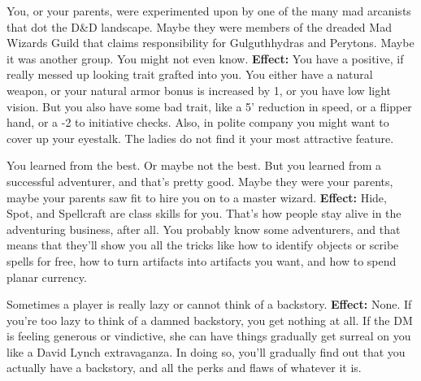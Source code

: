 \medskip{}
{You, or your parents, were experimented upon by one of the many mad arcanists that dot the D\&D landscape. Maybe they were members of the dreaded Mad Wizards Guild that claims responsibility for Gulguthhydras and Perytons. Maybe it was another group. You might not even know.}
\textbf{Effect:}{ You have a positive, if really messed up looking trait grafted into you. You either have a natural weapon, or your natural armor bonus is increased by 1, or you have low light vision. But you also have some bad trait, like a 5' reduction in speed, or a flipper hand, or a -2 to initiative checks. Also, in polite company you might want to cover up your eyestalk. The ladies do not find it your most attractive feature.}

\clearpage
\medskip{}
{You learned from the best. Or maybe not the best. But you learned from a successful adventurer, and that's pretty good. Maybe they were your parents, maybe your parents saw fit to hire you on to a master wizard.}
\textbf{Effect:}{ Hide, Spot, and Spellcraft are class skills for you. That's how people stay alive in the adventuring business, after all. You probably know some adventurers, and that means that they'll show you all the tricks like how to identify objects or scribe spells for free, how to turn artifacts into artifacts you want, and how to spend planar currency.}

\medskip{}
{Sometimes a player is really lazy or cannot think of a backstory.}
\textbf{Effect:}{ None. If you're too lazy to think of a damned backstory, you get nothing at all. If the DM is feeling generous or vindictive, she can have things gradually get surreal on you like a David Lynch extravaganza. In doing so, you'll gradually find out that you actually have a backstory, and all the perks and flaws of whatever it is.}
